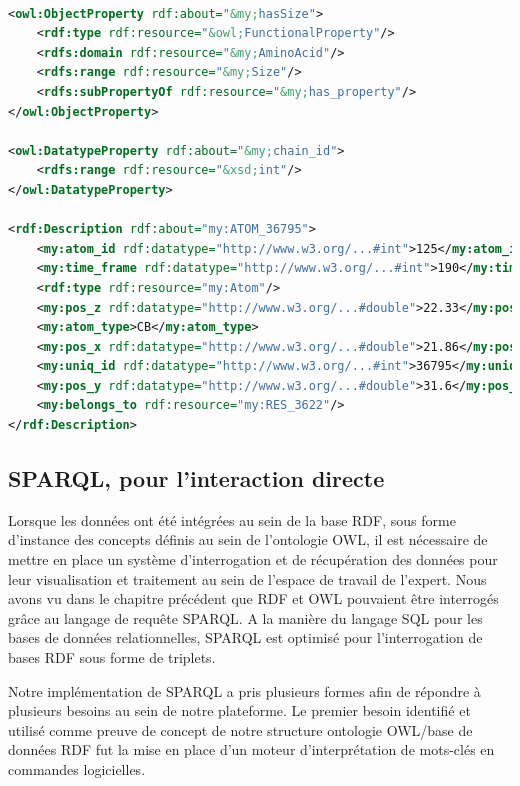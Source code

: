 \begin{lstlisting}[language=XML, caption=Exemple de triplets RDF présents dans notre base de données, label=rdf_xml]

<owl:ObjectProperty rdf:about="&my;hasSize">
    <rdf:type rdf:resource="&owl;FunctionalProperty"/>
    <rdfs:domain rdf:resource="&my;AminoAcid"/>
    <rdfs:range rdf:resource="&my;Size"/>
    <rdfs:subPropertyOf rdf:resource="&my;has_property"/>
</owl:ObjectProperty>

<owl:DatatypeProperty rdf:about="&my;chain_id">
    <rdfs:range rdf:resource="&xsd;int"/>
</owl:DatatypeProperty>

<rdf:Description rdf:about="my:ATOM_36795">
	<my:atom_id rdf:datatype="http://www.w3.org/...#int">125</my:atom_id>
	<my:time_frame rdf:datatype="http://www.w3.org/...#int">190</my:time_frame>
	<rdf:type rdf:resource="my:Atom"/>
	<my:pos_z rdf:datatype="http://www.w3.org/...#double">22.33</my:pos_z>
	<my:atom_type>CB</my:atom_type>
	<my:pos_x rdf:datatype="http://www.w3.org/...#double">21.86</my:pos_x>
	<my:uniq_id rdf:datatype="http://www.w3.org/...#int">36795</my:uniq_id>
	<my:pos_y rdf:datatype="http://www.w3.org/...#double">31.6</my:pos_y>
	<my:belongs_to rdf:resource="my:RES_3622"/>
</rdf:Description>

\end{lstlisting}

\subsection{SPARQL, pour l'interaction directe} \label{sparql_interpretation_engine}

Lorsque les données ont été intégrées au sein de la base RDF, sous forme d'instance des concepts définis au sein de l'ontologie OWL, il est nécessaire de mettre en place un système d'interrogation et de récupération des données pour leur visualisation et traitement au sein de l'espace de travail de l'expert. Nous avons vu dans le chapitre précédent que RDF et OWL pouvaient être interrogés grâce au langage de requête SPARQL. A la manière du langage SQL pour les bases de données relationnelles, SPARQL est optimisé pour l'interrogation de bases RDF sous forme de triplets.

Notre implémentation de SPARQL a pris plusieurs formes afin de répondre à plusieurs besoins au sein de notre plateforme. Le premier besoin identifié et utilisé comme preuve de concept de notre structure ontologie OWL/base de données RDF fut la mise en place d'un moteur d'interprétation de mots-clés en commandes logicielles.

